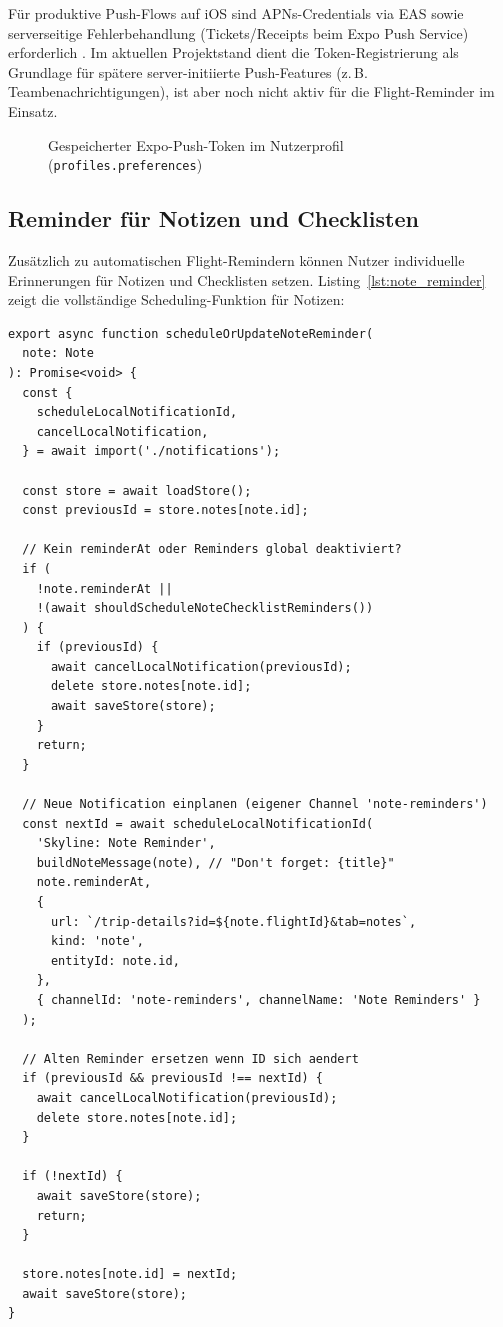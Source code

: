 Für produktive Push-Flows auf iOS sind APNs-Credentials via EAS sowie serverseitige
Fehlerbehandlung (Tickets/Receipts beim Expo Push Service) erforderlich
\cite{expoPushSetup,expoSendPushService}.
Im aktuellen Projektstand dient die Token-Registrierung als Grundlage für spätere
server-initiierte Push-Features (z.\,B. Teambenachrichtigungen), ist aber noch nicht
aktiv für die Flight-Reminder im Einsatz.

\begin{figure}[H]
  \centering
  \caption{Gespeicherter Expo-Push-Token im Nutzerprofil (\texttt{profiles.preferences})}
  \label{fig:push_token}
\end{figure}

\subsection{Reminder für Notizen und Checklisten}
\label{subsec:notes-checklists}

Zusätzlich zu automatischen Flight-Remindern können Nutzer individuelle Erinnerungen
für Notizen und Checklisten setzen.
Listing~\ref{lst:note_reminder} zeigt die vollständige Scheduling-Funktion für Notizen:

\begin{lstlisting}[style=skyline-ts,
  caption={Vollstaendiges scheduleOrUpdateNoteReminder
           (services/noteChecklistReminderService.ts)},
  label={lst:note_reminder}]
export async function scheduleOrUpdateNoteReminder(
  note: Note
): Promise<void> {
  const {
    scheduleLocalNotificationId,
    cancelLocalNotification,
  } = await import('./notifications');

  const store = await loadStore();
  const previousId = store.notes[note.id];

  // Kein reminderAt oder Reminders global deaktiviert?
  if (
    !note.reminderAt ||
    !(await shouldScheduleNoteChecklistReminders())
  ) {
    if (previousId) {
      await cancelLocalNotification(previousId);
      delete store.notes[note.id];
      await saveStore(store);
    }
    return;
  }

  // Neue Notification einplanen (eigener Channel 'note-reminders')
  const nextId = await scheduleLocalNotificationId(
    'Skyline: Note Reminder',
    buildNoteMessage(note), // "Don't forget: {title}"
    note.reminderAt,
    {
      url: `/trip-details?id=${note.flightId}&tab=notes`,
      kind: 'note',
      entityId: note.id,
    },
    { channelId: 'note-reminders', channelName: 'Note Reminders' }
  );

  // Alten Reminder ersetzen wenn ID sich aendert
  if (previousId && previousId !== nextId) {
    await cancelLocalNotification(previousId);
    delete store.notes[note.id];
  }

  if (!nextId) {
    await saveStore(store);
    return;
  }

  store.notes[note.id] = nextId;
  await saveStore(store);
}
\end{lstlisting}


